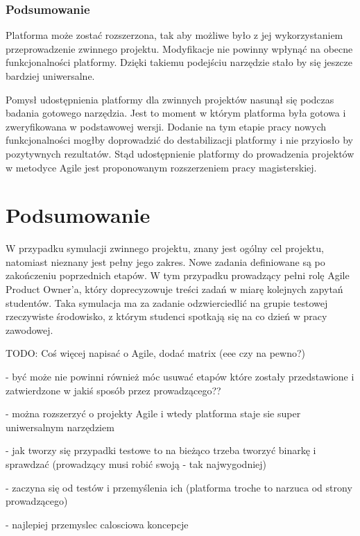 \subsubsection{Podsumowanie}

Platforma może zostać rozszerzona, tak aby możliwe było z jej wykorzystaniem przeprowadzenie zwinnego projektu.
Modyfikacje nie powinny wpłynąć na obecne funkcjonalności platformy.
Dzięki takiemu podejściu narzędzie stało by się jeszcze bardziej uniwersalne.

Pomysł udostępnienia platformy dla zwinnych projektów nasunął się podczas badania gotowego narzędzia.
Jest to moment w którym platforma była gotowa i zweryfikowana w podstawowej wersji.
Dodanie na tym etapie pracy nowych funkcjonalności mogłby doprowadzić do destabilizacji platformy i nie przyiosło by pozytywnych rezultatów.
Stąd udostępnienie platformy do prowadzenia projektów w metodyce Agile jest proponowanym rozszerzeniem pracy magisterskiej.


\section{Podsumowanie}
\label{research_summary}

W przypadku symulacji zwinnego projektu, znany jest ogólny cel projektu, natomiast nieznany jest pełny jego zakres.
Nowe zadania definiowane są po zakończeniu poprzednich etapów.
W tym przypadku prowadzący pełni rolę Agile Product Owner’a, który doprecyzowuje treści zadań w miarę kolejnych zapytań studentów.
Taka symulacja ma za zadanie odzwierciedlić na grupie testowej rzeczywiste środowisko, z którym studenci spotkają się na co dzień w pracy zawodowej.




TODO: Coś więcej napisać o Agile, dodać matrix (eee czy na pewno?)

- być może nie powinni również móc usuwać etapów które zostały przedstawione i zatwierdzone w jakiś sposób przez prowadzącego??

- można rozszerzyć o projekty Agile i wtedy platforma staje sie super uniwersalnym narzędziem

- jak tworzy się przypadki testowe to na bieżąco trzeba tworzyć binarkę i sprawdzać (prowadzący musi robić swoją - tak najwygodniej)

- zaczyna się od testów i przemyślenia ich (platforma troche to narzuca od strony prowadzącego)

- najlepiej przemyslec calosciowa koncepcje

